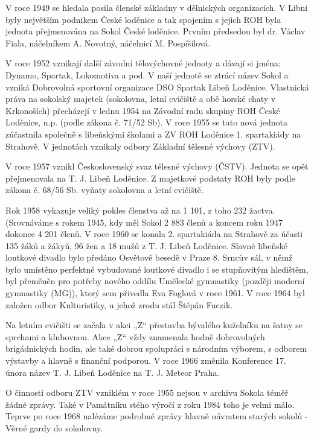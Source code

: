 V roce 1949 se hledala posila členské základny v dělnických
organizacích. V Libni byly největším podnikem České loděnice a tak
spojením s jejich ROH byla jednota přejmenována na Sokol České loděnice.
Prvním předsedou byl dr. Václav Fiala, náčelníkem A. Novotný, náčelnicí
M. Pospíšilová.

V roce 1952 vznikají další závodní tělovýchovné jednoty a dávají si
jména: Dynamo, Spartak, Lokomotiva a pod. V naší jednotě se ztrácí název
Sokol a vzniká Dobrovolná sportovní organizace DSO Spartak Libeň
Loděnice. Vlastnická práva na sokolský majetek (sokolovna, letní
cvičiště a obě horské chaty v Krkonoších) přecházejí v lednu 1954 na
Závodní radu skupiny ROH České Loděnice, n.p. (podle zákona č. 71/52
Sb). V roce 1955 se tato nová jednota zúčastnila společně s libeňskými
školami a ZV ROH Loděnice 1. spartakiády na Strahově. V jednotách
vznikaly odbory Základní tělesné výchovy (ZTV).

V roce 1957 vznikl Československý svaz tělesné výchovy (ČSTV). Jednota
se opět přejmenovala na T. J. Libeň Loděnice. Z majetkové podstaty ROH
byly podle zákona č. 68/56 Sb. vyňaty sokolovna a letní cvičiště.

Rok 1958 vykazuje veliký pokles členstva až na 1 101, z toho 232 žactva.
(Srovnáváme s rokem 1945, kdy měl Sokol 2 883 členů a koncem roku 1947
dokonce 4 201 členů. V roce 1960 se konala 2. spartakiáda na Strahově za
účasti 135 žáků a žákyň, 96 žen a 18 mužů z T. J. Libeň Loděnice. Slavné
libeňské loutkové divadlo bylo předáno Osvětové besedě v Praze 8. Srncův
sál, v němž bylo umístěno perfektně vybudované loutkové divadlo i se
stupňovitým hledištěm, byl přeměněn pro potřeby nového oddílu Umělecké
gymnastiky (později moderní gymnastiky (MG)), který sem přivedla Eva
Foglová v roce 1961. V roce 1964 byl založen odbor Kulturistiky, u jehož
zrodu stál Štěpán Fuczik.

Na letním cvičišti se začala v akci „Z`` přestavba bývalého kuželníku na
šatny se sprchami a klubovnou. Akce „Z`` vždy znamenala hodně
dobrovolných brigádnických hodin, ale také dobrou spolupráci s národním
výborem, s odborem výstavby a hlavně s finanční podporou. V roce 1966
změnila Konference 17. února název T. J. Libeň Loděnice na T. J. Meteor
Praha.

O činnosti odboru ZTV vzniklém v roce 1955 nejsou v archivu Sokola téměř
žádné zprávy. Také v Památníku stého výročí z roku 1984 toho je velmi
málo. Teprve po roce 1968 nalézáme podrobné zprávy hlavně návratem
starých sokolů - Věrné gardy do sokolovny.


